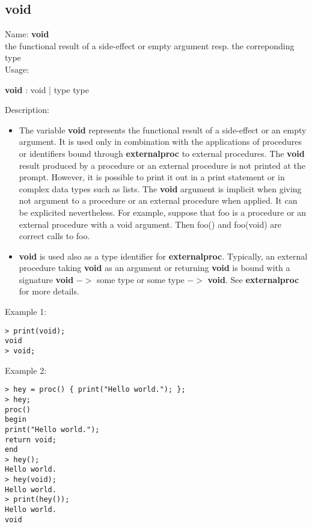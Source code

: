 \subsection{void}
\label{labvoid}
\noindent Name: \textbf{void}\\
the functional result of a side-effect or empty argument resp. the correponding type\\

\noindent Usage: 
\begin{center}
\textbf{void} : \textsf{void} | \textsf{type type}\\
\end{center}
\noindent Description: \begin{itemize}

\item The variable \textbf{void} represents the functional result of a
   side-effect or an empty argument.  It is used only in combination with
   the applications of procedures or identifiers bound through
   \textbf{externalproc} to external procedures.
   The \textbf{void} result produced by a procedure or an external procedure
   is not printed at the prompt. However, it is possible to print it out
   in a print statement or in complex data types such as lists.
   The \textbf{void} argument is implicit when giving not argument to a
   procedure or an external procedure when applied. It can be explicited
   nevertheless.  For example, suppose that foo is a procedure or an
   external procedure with a void argument. Then foo() and foo(void) are
   correct calls to foo.

\item \textbf{void} is used also as a type identifier for
   \textbf{externalproc}. Typically, an external procedure taking \textbf{void} as an
   argument or returning \textbf{void} is bound with a signature \textbf{void} $->$
   some type or some type $->$ \textbf{void}. See \textbf{externalproc} for more
   details.
\end{itemize}
\noindent Example 1: 
\begin{center}\begin{minipage}{15cm}\begin{Verbatim}[frame=single]
> print(void);
void
> void;
\end{Verbatim}
\end{minipage}\end{center}
\noindent Example 2: 
\begin{center}\begin{minipage}{15cm}\begin{Verbatim}[frame=single]
> hey = proc() { print("Hello world."); };
> hey;
proc()
begin
print("Hello world.");
return void;
end
> hey();
Hello world.
> hey(void);
Hello world.
> print(hey());
Hello world.
void
\end{Verbatim}
\end{minipage}\end{center}
